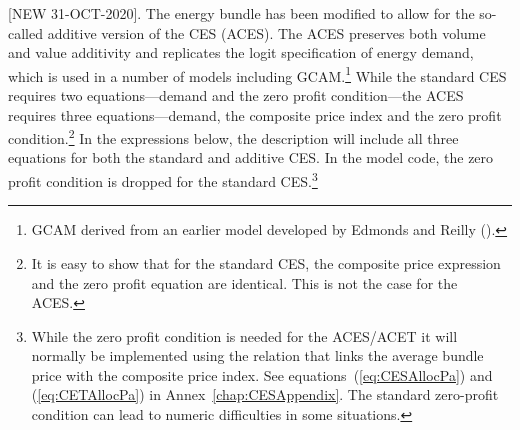 \documentclass[11pt,letterpaper]{report}
\begin{document}
[NEW 31-OCT-2020]. The energy bundle has been modified to allow for
the so-called additive version of the CES (ACES). The ACES preserves
both volume and value additivity and replicates the logit specification
of energy demand, which is used in a number of models including
GCAM.\footnote{GCAM derived from an earlier model developed
by Edmonds and Reilly (\cite{EdmondsReilly1985}).} While the standard CES
requires two equations---demand and the zero profit condition---the ACES
requires three equations---demand, the composite price index and the
zero profit condition.\footnote{It is easy to show that for the standard
CES, the composite price expression and the zero profit equation are
identical. This is not the case for the ACES.} In the expressions below,
the description will include all three equations for both the standard
and additive CES. In the model code, the zero profit condition
is dropped for the standard CES.\footnote{While the zero profit
condition is needed for the ACES/ACET it will normally be implemented
using the relation that links the average bundle price with the
composite price index. See equations~(\ref{eq:CESAllocPa})
and (\ref{eq:CETAllocPa}) in Annex~\ref{chap:CESAppendix}. The standard
zero-profit condition can lead to numeric difficulties in some
situations.}
\end{document}
